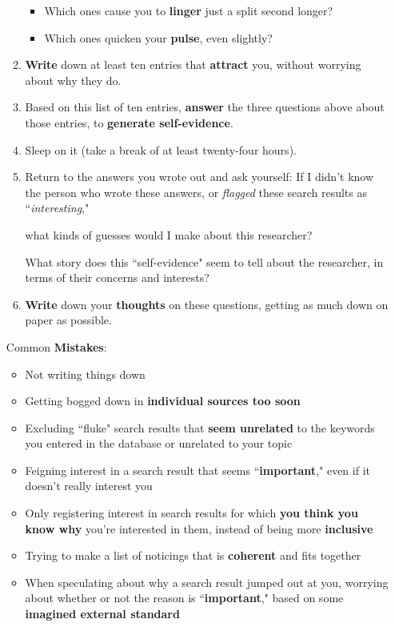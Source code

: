 \documentclass[11pt]{article}
\begin{document}
\begin{itemize}
\begin{exercise}
\begin{enumerate}
\begin{itemize}
\item Which ones cause you to \textbf{linger} just a split second longer?

\item Which ones quicken your \textbf{pulse}, even slightly?
\end{itemize}

\item \textbf{Write} down at least ten entries that \textbf{attract} you, without worrying about why they do.

\item Based on this list of ten entries, \textbf{answer} the three questions above about those entries, to \textbf{generate self-evidence}.

\item Sleep on it (take a break of at least twenty-four hours).

\item Return to the answers you wrote out and ask yourself: If I didn’t know the person who wrote these answers, or \emph{flagged} these search results as ``\emph{interesting}," 

what kinds of guesses would I make about this researcher? 

What story does this ``self-evidence" seem to tell about the researcher, in terms of their concerns and interests?

\item \textbf{Write} down your \textbf{thoughts} on these questions, getting as much down on paper as possible.
\end{enumerate}
\end{exercise}
Common \textbf{Mistakes}:
\begin{itemize}
\item Not writing things down
\item Getting bogged down in \textbf{individual sources too soon}
\item Excluding ``fluke" search results that \textbf{seem unrelated} to the keywords you entered in the database or unrelated to your topic
\item Feigning interest in a search result that seems ``\textbf{important}," even if it doesn’t really interest you
\item Only registering interest in search results for which \textbf{you think you know why} you’re interested in them, instead of being more \textbf{inclusive}
\item Trying to make a list of noticings that is \textbf{coherent} and fits together
\item When speculating about why a search result jumped out at you, worrying about whether or not the reason is ``\textbf{important}," based on some \textbf{imagined external standard}
\end{itemize}


\end{itemize}
\end{document}
